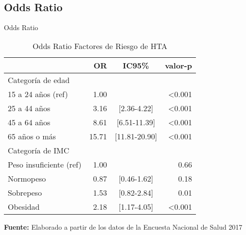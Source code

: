 \documentclass[aspectratio=169]{beamer}
\begin{document}
\subsection*{Odds Ratio}
\begin{frame}{Odds Ratio}
    \begin{table}[b]
\caption{\small Odds Ratio Factores de Riesgo de HTA}
    \centering
    \small
\begin{tabular}{lrcr}
\toprule
  & OR & IC95\% & valor-p\\
\midrule
Categoría de edad\\
\-\hspace{5mm} \small  15 a 24 años (ref) & 1.00 & & <0.001\\
\-\hspace{5mm} \small   25 a 44 años & 3.16 & [2.36-4.22] & <0.001\\
\-\hspace{5mm} \small   45 a 64 años & 8.61 & [6.51-11.39] & <0.001\\
\-\hspace{5mm} \small   65 años o más & 15.71 & [11.81-20.90] & <0.001\\
\addlinespace
Categoría de IMC\\
\-\hspace{5mm} \small   Peso insuficiente (ref) & 1.00 &  & 0.66\\
\-\hspace{5mm} \small   Normopeso & 0.87 & [0.46-1.62] & 0.18\\
\-\hspace{5mm} \small  Sobrepeso & 1.53 & [0.82-2.84] & 0.01\\
\-\hspace{5mm} \small   Obesidad & 2.18 & [1.17-4.05] & <0.001\\
\bottomrule
\end{tabular}
    \vspace{1ex}
    
    {\raggedright \small \textbf{Fuente:} Elaborado a partir de los datos de la Encuesta Nacional de Salud 2017 \par}
\end{table}
\end{frame}
\end{document}
